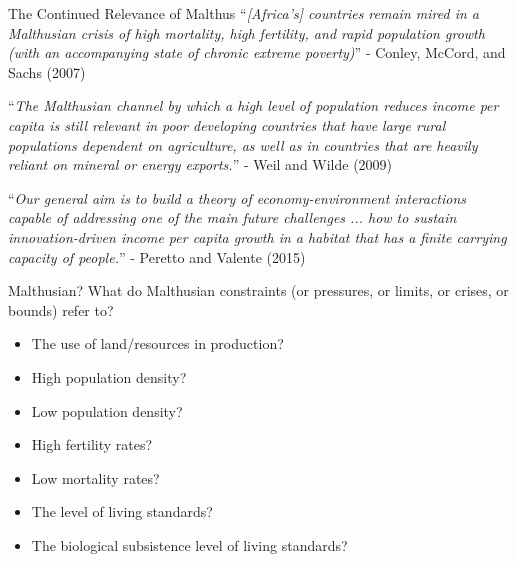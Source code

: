 \documentclass[10pt, xcolor=dvipsnames]{beamer}
\begin{document}
\begin{frame}{The Continued Relevance of Malthus}
``\textit{[Africa's] countries remain mired in a Malthusian crisis of high mortality, high fertility, and rapid population growth (with an accompanying state of chronic extreme poverty)}'' - Conley, McCord, and Sachs (2007)

\vspace{.5cm}
``\textit{The Malthusian channel by which a high level of population reduces income per capita is still relevant in poor developing countries that have large rural populations dependent on agriculture, as well as in countries that are heavily reliant on mineral or energy exports.}'' - Weil and Wilde (2009)

\vspace{.5cm}
``\textit{Our general aim is to build a theory of economy-environment interactions capable of addressing one of the main future challenges ... how to sustain innovation-driven income per capita growth in a habitat that has a finite carrying capacity of people.}'' - Peretto and Valente (2015)
\end{frame}


\begin{frame}{Malthusian?}
What do Malthusian constraints (or pressures, or limits, or crises, or bounds) refer to?
\begin{itemize}
\item The use of land/resources in production?
\item High population density?
\item Low population density?
\item High fertility rates?
\item Low mortality rates?
\item The level of living standards? 
\item The biological subsistence level of living standards?
\end{itemize}

\end{frame}
\end{document}
